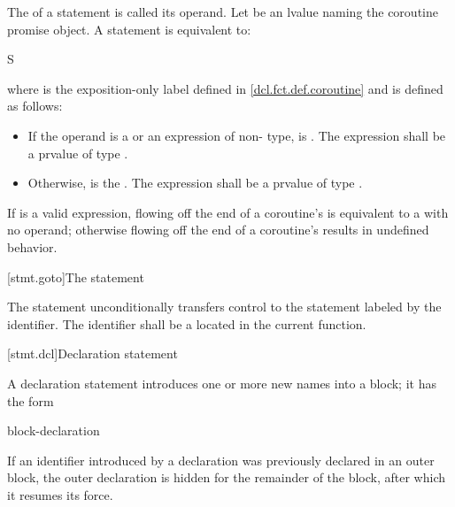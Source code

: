 \pnum
The  of a  statement is
called its operand.
Let  be an lvalue naming the coroutine
promise object.
A  statement is equivalent to:
\begin{ncsimplebnf}
\terminal{\{} S\terminal{;}  \terminal{;} \terminal{\}}
\end{ncsimplebnf}
where  is the exposition-only label
defined in \ref{dcl.fct.def.coroutine}
and  is defined as follows:
\begin{itemize}
\item
If the operand is a  or an expression of non- type,
 is \tcode{)}.
The expression  shall be a prvalue of type .

\item
Otherwise,
 is the  \tcode{\{}{ } \tcode{;} \tcode{;{ }\}}.
The expression 
shall be a prvalue of type .
\end{itemize}

\pnum
If  is a valid expression,
flowing off the end of a coroutine's 
is equivalent to a  with no operand;
otherwise flowing off the end of a coroutine's 
results in undefined behavior.

[stmt.goto]{The  statement}%

\pnum
The  statement unconditionally transfers control to the
statement labeled by the identifier. The identifier shall be a
%
 located in the current function.

[stmt.dcl]{Declaration statement}%

\pnum
A declaration statement introduces one or more new names into a
block; it has the form
\begin{bnf}
\br
    block-declaration
\end{bnf}
\begin{note}
If an identifier introduced by a declaration was previously declared in
an outer block,
%
%
%
the outer declaration is hidden
for the remainder of the block,
after which it resumes its force.
\end{note}

